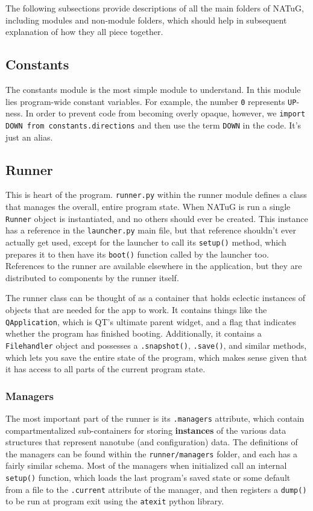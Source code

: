 \documentclass[titlepage]{article}
\begin{document}
	The following subsections provide descriptions of all the main folders of NATuG, including modules and non-module folders, which should help in subsequent explanation of how they all piece together.
	
	\subsection{Constants}
	The constants module is the most simple module to understand. In this module lies program-wide constant variables. For example, the number \texttt{0} represents \texttt{UP}-ness. In order to prevent code from becoming overly opaque, however, we \texttt{import DOWN from constants.directions} and then use the term \texttt{DOWN} in the code. It's just an alias.
	
	\subsection{Runner}
	This is heart of the program. \texttt{runner.py} within the runner module defines a class that manages the overall, entire program state. When NATuG is run a single \texttt{Runner} object is instantiated, and no others should ever be created. This instance has a reference in the \texttt{launcher.py} main file, but that reference shouldn't ever actually get used, except for the launcher to call its \texttt{setup()} method, which prepares it to then have its \texttt{boot()} function called by the launcher too. References to the runner are available elsewhere in the application, but they are distributed to components by the runner itself. 
	
	The runner class can be thought of as a container that holds eclectic instances of objects that are needed for the app to work. It contains things like the \texttt{QApplication}, which is QT's ultimate parent widget, and a flag that indicates whether the program has finished booting. Additionally, it contains a \texttt{Filehandler} object and possesses a \texttt{.snapshot()}, \texttt{.save()}, and similar methods, which lets you save the entire state of the program, which makes sense given that it has access to all parts of the current program state. 
	
	\subsubsection{Managers} \label{sect:managers}
	The most important part of the runner is its \texttt{.managers} attribute, which contain compartmentalized sub-containers for storing \textbf{instances} of the various data structures that represent nanotube (and configuration) data. The definitions of the managers can be found within the \texttt{runner/managers} folder, and each has a fairly similar schema. Most of the managers when initialized call an internal \texttt{setup()} function, which loads the last program's saved state or some default from a file to the \texttt{.current} attribute of the manager, and then registers a \texttt{dump()} to be run at program exit using the \texttt{atexit} python library. 
	
\end{document}
